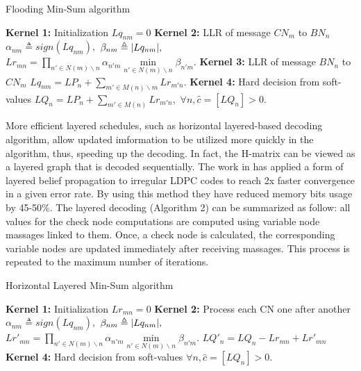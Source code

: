 \documentclass[conference]{IEEEtran}
\DeclarePairedDelimiter\abs{\lvert}{\rvert}%
\begin{document}
\begin{algorithm}\label{algorithm1}
\renewcommand\thealgorithm{}
\caption{Flooding Min-Sum algorithm}
\begin{algorithmic}[1]
\STATE \textbf{Kernel 1:} Initialization
\STATE
$Lq_{nm}=0$%
\ENDFOR
{}
\STATE \textbf{Kernel 2:} LLR of message $CN_m$ to $BN_n$
\STATE $\alpha_{nm} \triangleq sign(Lq_{nm}),$
\STATE $\beta_{nm} \triangleq \abs{Lq_{nm}},$
\STATE $Lr_{mn} = \prod\limits_{n' \in N(m)\backslash n} \alpha_{n'm} \min\limits_{n' \in N(m)\backslash n} \beta_{n'm}.$
\ENDFOR
\STATE \textbf{Kernel 3:} LLR of message $BN_n$ to $CN_m$
\STATE $Lq_{nm} = LP_n + \sum\limits_{m' \in M(n)\backslash m} Lr_{m'n}.$
\ENDFOR  
\ENDFOR %
\STATE \textbf{Kernel 4:} Hard decision from soft-values
\STATE $LQ_{n} = LP_n + \sum\limits_{m' \in M(n)} Lr_{m'n},$
\STATE $\forall n, \hat{c}=[LQ_n]>0.$
\ENDFOR
\end{algorithmic}
\addtocounter{algorithm}{-1}
\end{algorithm}

More efficient layered schedules, such as horizontal layered-based decoding algorithm, allow updated imformation to be utilized more quickly in the algorithm, thus, speeding up the decoding\cite{art_layered0, art_layered1}. In fact, the H-matrix can be viewed as a layered graph that is decoded sequentially. The work in \cite{art_gpu_0} has applied a form of layered belief propagation to irregular LDPC codes to reach 2x faster convergence in a given error rate. By using this method they have reduced memory bits usage by 45-50\%. The layered decoding (Algorithm 2) can be summarized as follow: all values for the check node computations are computed using variable node massages linked to them. Once, a check node is calculated, the corresponding variable nodes are updated immediately after receiving massages. This process is repeated to the maximum number of iterations.
\begin{algorithm}\label{algorithm2}
\renewcommand\thealgorithm{}
\caption{Horizontal Layered Min-Sum algorithm}
\begin{algorithmic}
\STATE \textbf{Kernel 1:} Initialization
\STATE
$Lr_{mn}=0$
\ENDFOR
{}
\STATE \textbf{Kernel 2:} Process each CN one after another
\STATE $\alpha_{nm} \triangleq sign(Lq_{nm}),$
\STATE $\beta_{nm} \triangleq \abs{Lq_{nm}},$
\STATE $Lr'_{mn} = \prod\limits_{n' \in N(m)\backslash n} \alpha_{n'm} \min\limits_{n' \in N(m)\backslash n} \beta_{n'm}.$ \STATE{}
\ENDFOR
\ENDFOR
{}
\STATE $LQ'_n=LQ_n-Lr_{mn}+Lr'_{mn}$
\ENDFOR
\ENDFOR %
\STATE \textbf{Kernel 4:} Hard decision from soft-values
\STATE $\forall n, \hat{c}=[LQ_n]>0.$
\ENDFOR
\end{algorithmic}
\addtocounter{algorithm}{-1}
\end{algorithm}
\end{document}
